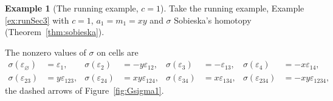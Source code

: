 \documentclass[12pt]{amsart}
\theoremstyle{plain}
\theoremstyle{definition}
\newtheorem{example}[theorem]{Example}
\newcommand{\eps}{\varepsilon}
\begin{document}
\begin{example}[The running example, $c = 1$]\label{ex:running}
    Take the running example, Example \ref{ex:runSec3}
    with $c = 1$, $a_1 = m_1 = xy$ and $\sigma$ Sobieska's homotopy (Theorem~\ref{thm:sobieska}).

    The nonzero values of $\sigma$ on cells are
    \[
        \begin{aligned}
            \sigma(\eps_\varnothing) &= \eps_1, & \sigma(\eps_2) &= -y \eps_{12}, & \sigma(\eps_3) &= -\eps_{13}, & \sigma(\eps_4) &= -x \eps_{14},\\
            \sigma(\eps_{23}) &= y \eps_{123}, & \sigma(\eps_{24}) &= xy \eps_{124}, & \sigma(\eps_{34}) &= x \eps_{134}, & \sigma(\eps_{234}) &= -xy \eps_{1234},
        \end{aligned}
    \]
    the dashed arrows of Figure~\ref{fig:Gsigma1}.


\end{example}
\end{document}
